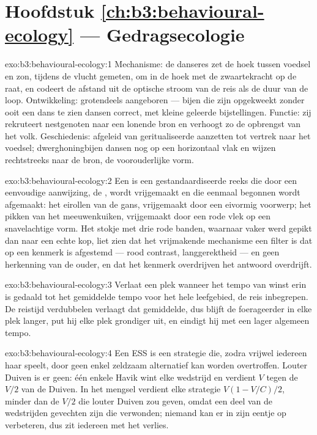 \section*{Hoofdstuk \ref{ch:b3:behavioural-ecology} --- Gedragsecologie}

\begin{solution}{exo:b3:behavioural-ecology:1}
Mechanisme: de danseres zet de hoek tussen voedsel en zon, tijdens de
vlucht gemeten, om in de hoek met de zwaartekracht op de raat, en
codeert de afstand uit de optische stroom van de reis als de duur van
de loop. Ontwikkeling: grotendeels aangeboren --- bijen die zijn
opgekweekt zonder ooit een dans te zien dansen correct, met kleine
geleerde bijstellingen. Functie: zij rekruteert nestgenoten naar een
lonende bron en verhoogt zo de opbrengst van het volk. Geschiedenis:
afgeleid van geritualiseerde aanzetten tot vertrek naar het voedsel;
dwerghoningbijen dansen nog op een horizontaal vlak en wijzen
rechtstreeks naar de bron, de voorouderlijke vorm.
\end{solution}

\begin{solution}{exo:b3:behavioural-ecology:2}
Een  is een gestandaardiseerde reeks die door een
eenvoudige aanwijzing, de , wordt vrijgemaakt en die
eenmaal begonnen wordt afgemaakt: het eirollen van de gans, vrijgemaakt
door een eivormig voorwerp; het pikken van het meeuwenkuiken,
vrijgemaakt door een rode vlek op een snavelachtige vorm. Het stokje
met drie rode banden, waarnaar vaker werd gepikt dan naar een echte
kop, liet zien dat het vrijmakende mechanisme een filter is dat op een
kenmerk is afgestemd --- rood contrast, langgerektheid --- en geen
herkenning van de ouder, en dat het kenmerk overdrijven het antwoord
overdrijft.
\end{solution}

\begin{solution}{exo:b3:behavioural-ecology:3}
Verlaat een plek wanneer het tempo van winst erin is gedaald tot het
gemiddelde tempo voor het hele leefgebied, de reis inbegrepen. De
reistijd verdubbelen verlaagt dat gemiddelde, dus blijft de
foerageerder in elke plek langer, put hij elke plek grondiger uit, en
eindigt hij met een lager algemeen tempo.
\end{solution}

\begin{solution}{exo:b3:behavioural-ecology:4}
Een ESS is een strategie die, zodra vrijwel iedereen haar speelt, door
geen enkel zeldzaam alternatief kan worden overtroffen. Louter Duiven
is er geen: één enkele Havik wint elke wedstrijd en verdient $V$ tegen
de $V/2$ van de Duiven. In het mengsel verdient elke strategie
$V(1 - V/C)/2$, minder dan de $V/2$ die louter Duiven zou geven, omdat
een deel van de wedstrijden gevechten zijn die verwonden; niemand kan
er in zijn eentje op verbeteren, dus zit iedereen met het verlies.
\end{solution}

